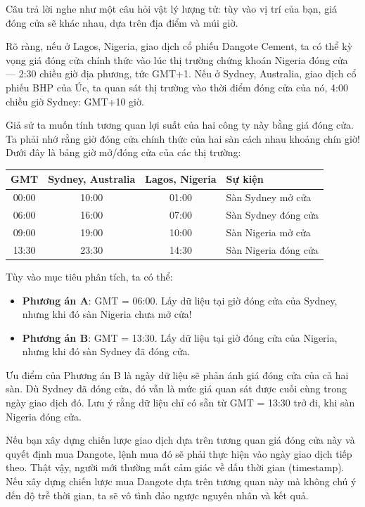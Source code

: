 Câu trả lời nghe như một câu hỏi vật lý lượng tử: tùy vào vị trí của bạn, giá đóng cửa sẽ khác nhau, dựa trên địa điểm và múi giờ.

Rõ ràng, nếu ở Lagos, Nigeria, giao dịch cổ phiếu Dangote Cement, ta có thể kỳ vọng giá đóng cửa chính thức vào lúc thị trường chứng khoán Nigeria đóng cửa — 2:30 chiều giờ địa phương, tức GMT+1. Nếu ở Sydney, Australia, giao dịch cổ phiếu BHP của Úc, ta quan sát thị trường vào thời điểm đóng cửa của nó, 4:00 chiều giờ Sydney: GMT+10 giờ.

Giả sử ta muốn tính tương quan lợi suất của hai công ty này bằng giá đóng cửa. Ta phải nhớ rằng giờ đóng cửa chính thức của hai sàn cách nhau khoảng chín giờ! Dưới đây là bảng giờ mở/đóng cửa của các thị trường:

\begin{center}
\begin{tabular}{|c|c|c|l|}
\hline
\textbf{GMT} & \textbf{Sydney, Australia} & \textbf{Lagos, Nigeria} & \textbf{Sự kiện} \\
\hline
00:00 & 10:00 & 01:00 & Sàn Sydney mở cửa \\
06:00 & 16:00 & 07:00 & Sàn Sydney đóng cửa \\
09:00 & 19:00 & 10:00 & Sàn Nigeria mở cửa \\
13:30 & 23:30 & 14:30 & Sàn Nigeria đóng cửa \\
\hline
\end{tabular}
\end{center}

Tùy vào mục tiêu phân tích, ta có thể:
\begin{itemize}
  \item \textbf{Phương án A}: GMT = 06:00. Lấy dữ liệu tại giờ đóng cửa của Sydney, nhưng khi đó sàn Nigeria chưa mở cửa!
  \item \textbf{Phương án B}: GMT = 13:30. Lấy dữ liệu tại giờ đóng cửa của Nigeria, nhưng khi đó sàn Sydney đã đóng cửa.
\end{itemize}

Ưu điểm của Phương án B là ngày dữ liệu sẽ phản ánh giá đóng cửa của cả hai sàn. Dù Sydney đã đóng cửa, đó vẫn là mức giá quan sát được cuối cùng trong ngày giao dịch đó. Lưu ý rằng dữ liệu chỉ có sẵn từ GMT = 13:30 trở đi, khi sàn Nigeria đóng cửa.

Nếu bạn xây dựng chiến lược giao dịch dựa trên tương quan giá đóng cửa này và quyết định mua Dangote, lệnh mua đó sẽ phải thực hiện vào ngày giao dịch tiếp theo. Thật vậy, người mới thường mất cảm giác về dấu thời gian (timestamp). Nếu xây dựng chiến lược mua Dangote dựa trên tương quan này mà không chú ý đến độ trễ thời gian, ta sẽ vô tình đảo ngược nguyên nhân và kết quả.

